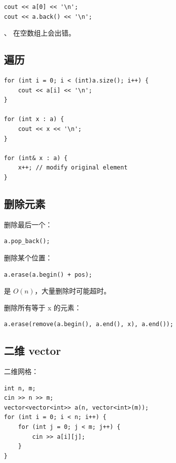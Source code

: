\begin{lstlisting}
cout << a[0] << '\n';
cout << a.back() << '\n';
\end{lstlisting}

、 在空数组上会出错。

\subsection{遍历}

\begin{lstlisting}
for (int i = 0; i < (int)a.size(); i++) {
    cout << a[i] << '\n';
}

for (int x : a) {
    cout << x << '\n';
}

for (int& x : a) {
    x++; // modify original element
}
\end{lstlisting}

\subsection{删除元素}

删除最后一个：

\begin{lstlisting}
a.pop_back();
\end{lstlisting}

删除某个位置：

\begin{lstlisting}
a.erase(a.begin() + pos);
\end{lstlisting}

 是 $O(n)$，大量删除时可能超时。

删除所有等于 x 的元素：

\begin{lstlisting}
a.erase(remove(a.begin(), a.end(), x), a.end());
\end{lstlisting}

\subsection{二维 vector}

二维网格：

\begin{lstlisting}
int n, m;
cin >> n >> m;
vector<vector<int>> a(n, vector<int>(m));
for (int i = 0; i < n; i++) {
    for (int j = 0; j < m; j++) {
        cin >> a[i][j];
    }
}
\end{lstlisting}


